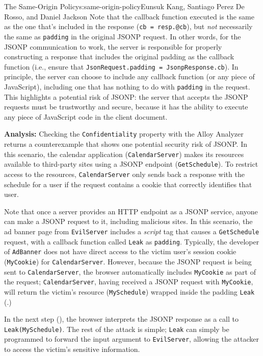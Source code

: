 \begin{aosachapter}{The Same-Origin Policy}{s:same-origin-policy}{Eunsuk Kang, Santiago Perez De Rosso, and Daniel Jackson}
Note that the callback function executed is the same as the one that's
included in the response (\texttt{cb = resp.@cb}), but \emph{not}
necessarily the same as \texttt{padding} in the original JSONP request.
In other words, for the JSONP communication to work, the server is
responsible for properly constructing a response that includes the
original padding as the callback function (i.e., ensure that
\texttt{JsonRequest.padding = JsonpResponse.cb}). In principle, the
server can choose to include any callback function (or any piece of
JavaScript), including one that has nothing to do with \texttt{padding}
in the request. This highlights a potential risk of JSONP: the server
that accepts the JSONP requests must be trustworthy and secure, because
it has the ability to execute any piece of JavaScript code in the client
document.

\textbf{Analysis:} Checking the \texttt{Confidentiality} property with
the Alloy Analyzer returns a counterexample that shows one potential
security risk of JSONP. In this scenario, the calendar application
(\texttt{CalendarServer}) makes its resources available to third-party
sites using a JSONP endpoint (\texttt{GetSchedule}). To restrict access
to the resources, \texttt{CalendarServer} only sends back a response
with the schedule for a user if the request contains a cookie that
correctly identifies that user.

Note that once a server provides an HTTP endpoint as a JSONP service,
anyone can make a JSONP request to it, including malicious sites. In
this scenario, the ad banner page from \texttt{EvilServer} includes a
\emph{script} tag that causes a \texttt{GetSchedule} request, with a
callback function called \texttt{Leak} as \texttt{padding}. Typically,
the developer of \texttt{AdBanner} does not have direct access to the
victim user's session cookie (\texttt{MyCookie}) for
\texttt{CalendarServer}. However, because the JSONP request is being
sent to \texttt{CalendarServer}, the browser automatically includes
\texttt{MyCookie} as part of the request; \texttt{CalendarServer},
having received a JSONP request with \texttt{MyCookie}, will return the
victim's resource (\texttt{MySchedule}) wrapped inside the padding
\texttt{Leak} (.)


In the next step (), the
browser interprets the JSONP response as a call to
\texttt{Leak(MySchedule)}. The rest of the attack is simple;
\texttt{Leak} can simply be programmed to forward the input argument to
\texttt{EvilServer}, allowing the attacker to access the victim's
sensitive information.


\end{aosachapter}
